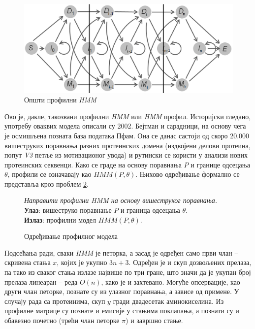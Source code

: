 \documentclass[12pt,oneside]{memoir}
\newenvironment{problem}[1][!ht]
{\renewcommand{\algorithmcfname}{Проблем}
\begin{figure}[!ht]
\centering
  \begin{minipage}{.94\linewidth}
	\begin{algorithm}[#1]%
  }{\end{algorithm}
  \end{minipage}
\end{figure}}
\begin{document}
\begin{CJK}{UTF8}{ipxm}
\begin{figure}[H]
  \centering
  \includegraphics[width=.95\textwidth]{prof_hmm.png}
  \caption{Општи профилни \textit{HMM}}
  \label{fig:prof_hmm}
\end{figure}

Ово је, дакле, такозвани профилни \textit{HMM} или \textit{HMM} профил. Историјски гледано, употребу оваквих модела описали су 2002. Бејтман и сарадници, на основу чега је осмишљена позната база података Пфам\cite{bateman2002}. Она се данас састоји од скоро 20.000 вишеструких поравнања разних протеинских домена (издвојени делови протеина, попут \textit{V3} петље из мотивационог увода) и рутински се користи у анализи нових протеинских секвенци\cite{pfam}. Како се граде на основу поравнања $P$ и границе одсецања $\theta$, профили се означавају као $HMM(P, \theta)$. Њихово одређивање формално се представља кроз проблем \ref{prob:prof}.

\begin{problem}[H]
  \SetAlgoLined
  \textit{Направити профилни \textit{HMM} на основу вишеструког поравнања.}\\
  \textbf{Улаз}: вишеструко поравнање $P$ и граница одсецања $\theta$.\\
  \textbf{Излаз}: профилни модел $HMM(P, \theta)$.
  \caption{Одређивање профилног модела\cite{ba10e}}
  \label{prob:prof}
\end{problem}

Подсећања ради, сваки \textit{HMM} је петорка, а засад је одређен само први члан -- скривена стања $x$, којих је укупно $3n+3$. Одређен је и скуп дозвољених прелаза, па тако из сваког стања излазе највише по три гране, што значи да је укупан број прелаза линеаран -- реда $O(n)$, како је и захтевано. Могуће опсервације, као други члан петорке, познате су из улазног поравнања, а зависе од примене. У случају рада са протеинима, скуп $y$ гради двадесетак аминокиселина. Из профилне матрице су познате и емисије у стањима поклапања, а познати су и обавезно почетно (трећи члан петорке $\pi$) и завршно стање.


\end{CJK}
\end{document}

